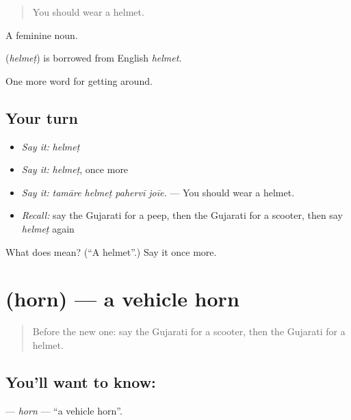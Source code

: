 \begin{quote}
You should wear a helmet.
\end{quote}

A feminine noun.

\begin{cousinweb}
\textbf{} (\emph{helmeṭ}) is borrowed from English \emph{helmet}.
\end{cousinweb}

\begin{grammarlens}[title={What you've built}]
One more word for getting around.
\end{grammarlens}

\subsection*{Your turn}
\begin{itemize}
\raggedright
  \item \emph{Say it:} \emph{helmeṭ}
  \item \emph{Say it:} \emph{helmeṭ}, once more
  \item \emph{Say it:} \emph{tamāre helmeṭ pahervī joīe.} — You should wear a helmet.
  \item \emph{Recall:} say the Gujarati for a peep, then the Gujarati for a scooter, then say \emph{helmeṭ} again
\end{itemize}

\begin{tcolorbox}[breakable,colback=teal!4,colframe=teal!35!black,title={Before you move on}]
What does  mean? (\textquotedblleft{}A helmet\textquotedblright{}.) Say it once more.
\end{tcolorbox}
\section[\texorpdfstring{\gu{હોર્ન} (horn)}{હોર્ન (horn)}]{ (horn) — a vehicle horn}

\label{lesson:GU-C400-horn}



\begin{quote}
Before the new one: say the Gujarati for a scooter, then the Gujarati for a helmet.
\end{quote}

\subsection*{You'll want to know: }
\textbf{} — \emph{horn} — \textquotedblleft{}a vehicle horn\textquotedblright{}.

